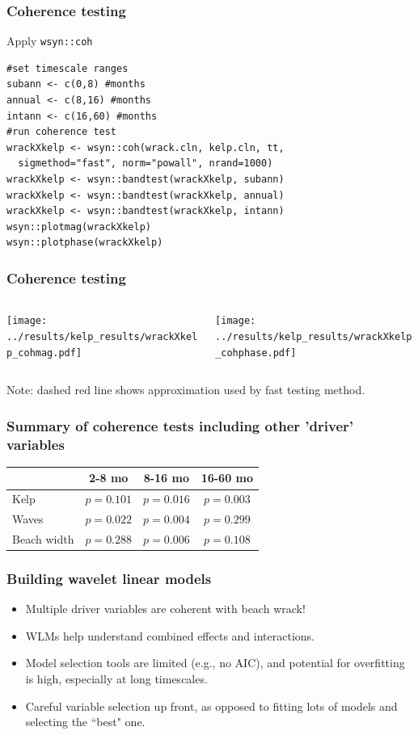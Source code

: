 \documentclass{beamer}
\begin{document}
\begin{frame}[fragile]
\frametitle{Coherence testing}
\begin{exampleblock}{Apply \texttt{wsyn::coh}}
\begin{verbatim}
#set timescale ranges
subann <- c(0,8) #months
annual <- c(8,16) #months
intann <- c(16,60) #months
#run coherence test
wrackXkelp <- wsyn::coh(wrack.cln, kelp.cln, tt, 
  sigmethod="fast", norm="powall", nrand=1000)
wrackXkelp <- wsyn::bandtest(wrackXkelp, subann)
wrackXkelp <- wsyn::bandtest(wrackXkelp, annual)
wrackXkelp <- wsyn::bandtest(wrackXkelp, intann)
wsyn::plotmag(wrackXkelp) 
wsyn::plotphase(wrackXkelp)
\end{verbatim}
\end{exampleblock}
\end{frame}

\begin{frame}
\frametitle{Coherence testing}
\begin{columns}[c]
\begin{column}{6cm}
\texttt{[image: ../results/kelp\_results/wrackXkelp\_cohmag.pdf]}
\end{column}
\begin{column}{6cm}
\texttt{[image: ../results/kelp\_results/wrackXkelp\_cohphase.pdf]}
\end{column}
\end{columns}
Note: dashed red line shows approximation used by fast testing method.
\end{frame}

\begin{frame}
\frametitle{Summary of coherence tests including other 'driver' variables}
\begin{tabular}{lccc}
\hline
    & 2-8 mo & 8-16 mo & 16-60 mo \\ 
\hline
  Kelp & $p=0.101$ & \textbf{$p=0.016$} & $p=0.003$ \\ 
\hline
  Waves & $p=0.022$ & $p=0.004$ & $p=0.299$ \\ 
\hline
  Beach width & $p=0.288$ & $p=0.006$ & $p=0.108$ \\
\hline
\end{tabular}
\end{frame}

\begin{frame}
\frametitle{Building wavelet linear models}
\begin{itemize}
\item Multiple driver variables are coherent with beach wrack!
\item WLMs help understand combined effects and interactions.
\item Model selection tools are limited (e.g., no AIC), and potential for overfitting is high, especially at long timescales.
\item Careful variable selection up front, as opposed to fitting lots of models and selecting the ``best" one.
\end{itemize}
\end{frame}
\end{document}
